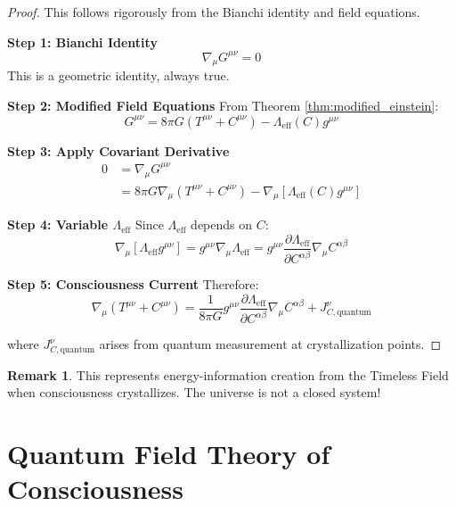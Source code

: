 \documentclass[11pt]{article}
\theoremstyle{definition}
\newtheorem{remark}[theorem]{Remark}
\begin{document}
\begin{proof}
This follows rigorously from the Bianchi identity and field equations.

\textbf{Step 1: Bianchi Identity}
\begin{equation}
\nabla_\mu G^{\mu\nu} = 0
\end{equation}
This is a geometric identity, always true.

\textbf{Step 2: Modified Field Equations}
From Theorem \ref{thm:modified_einstein}:
\begin{equation}
G^{\mu\nu} = 8\pi G(T^{\mu\nu} + C^{\mu\nu}) - \Lambda_{\text{eff}}(C)g^{\mu\nu}
\end{equation}

\textbf{Step 3: Apply Covariant Derivative}
\begin{align}
0 &= \nabla_\mu G^{\mu\nu}\\
&= 8\pi G\nabla_\mu(T^{\mu\nu} + C^{\mu\nu}) - \nabla_\mu[\Lambda_{\text{eff}}(C)g^{\mu\nu}]
\end{align}

\textbf{Step 4: Variable $\Lambda_{\text{eff}}$}
Since $\Lambda_{\text{eff}}$ depends on $C$:
\begin{equation}
\nabla_\mu[\Lambda_{\text{eff}} g^{\mu\nu}] = g^{\mu\nu}\nabla_\mu\Lambda_{\text{eff}} = g^{\mu\nu}\frac{\partial\Lambda_{\text{eff}}}{\partial C^{\alpha\beta}}\nabla_\mu C^{\alpha\beta}
\end{equation}

\textbf{Step 5: Consciousness Current}
Therefore:
\begin{equation}
\nabla_\mu(T^{\mu\nu} + C^{\mu\nu}) = \frac{1}{8\pi G}g^{\mu\nu}\frac{\partial\Lambda_{\text{eff}}}{\partial C^{\alpha\beta}}\nabla_\mu C^{\alpha\beta} + J^\nu_{C,\text{quantum}}
\end{equation}

where $J^\nu_{C,\text{quantum}}$ arises from quantum measurement at crystallization points.
\end{proof}

\begin{remark}
This represents energy-information creation from the Timeless Field when consciousness crystallizes. The universe is not a closed system!
\end{remark}

\section{Quantum Field Theory of Consciousness}
\end{document}
